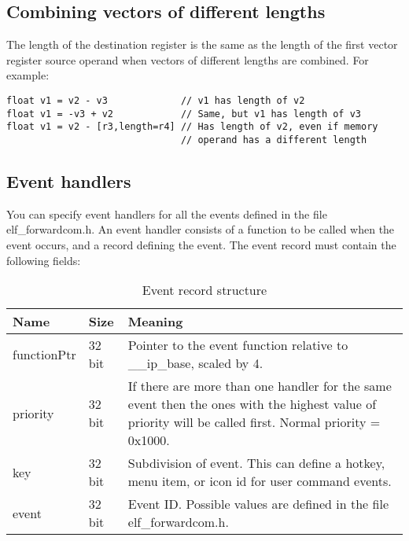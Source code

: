 \documentclass[forwardcom.tex]{subfiles}
\begin{document}
\subsection{Combining vectors of different lengths} \label{vectorsDifferentLengths}

The length of the destination register is the same as the length of the first vector register source operand when vectors of different lengths are combined. For example:
\vv

\begin{lstlisting}[frame=single]
float v1 = v2 - v3             // v1 has length of v2
float v1 = -v3 + v2            // Same, but v1 has length of v3
float v1 = v2 - [r3,length=r4] // Has length of v2, even if memory
                               // operand has a different length
\end{lstlisting}
\vspace{4mm}


\subsection{Event handlers} \label{EventHandlers}
You can specify event handlers for all the events defined in the file elf\_forwardcom.h.
An event handler consists of a function to be called when the event occurs, and a record
defining the event. The event record must contain the following fields:

\begin{longtable} {|p{20mm}|p{15mm}|p{100mm}|}
\caption{Event record structure} 
\label{table:EventRecordStructure}\\
\endfirsthead
\endhead
\hline
\bfseries Name & \bfseries Size & \bfseries Meaning  \\
\hline
functionPtr & 32 bit & Pointer to the event function relative to \_\_ip\_base, scaled by 4.\\
\hline
priority    & 32 bit & If there are more than one handler for the same event then the ones with
the highest value of priority will be called first. 
Normal priority = 0x1000.\\
\hline
key         & 32 bit & Subdivision of event. This can define a hotkey, menu item, or icon id for user command events.\\
\hline
event       & 32 bit & Event ID. Possible values are defined in the file \newline elf\_forwardcom.h.\\
\hline
\end{longtable}
\vv
\end{document}
